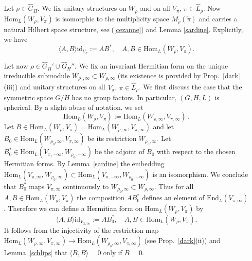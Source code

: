 \documentclass[10]{amsart}
\theoremstyle{remark}
\theoremstyle{definition}
\numberwithin{equation}{section}
\newcommand{\End}{\text{End}}
\newcommand{\Hom}{\mathrm{Hom}}
\newcommand{\id}{\mathrm{id}}
\begin{document}
{Let $\rho\in\widehat G_H$. We fix unitary structures on $W_\rho$ and on all $V_\pi$, $\pi\in\widehat L_\rho$.
Now $\Hom_L(W_{\rho},V_{\pi})$
is isomorphic to the multiplicity space $M_{\tilde\rho}(\tilde\pi)$ and carries a natural Hilbert space structure, see (\ref{cezanne}) and Lemma \ref{sardine}. Explicitly, we have
$$ \langle A, B\rangle \id_{V_\pi}:=AB^*,\quad A,B\in \Hom_L(W_{\rho},V_{\pi}).$$

Let now $\rho\in \widehat G_H'\cup \widehat G_H''$. We fix an invariant Hermitian form on the unique irreducible submodule $W_{\rho_0,\infty}\subset W_{\rho,\infty}$ (its existence is provided by Prop.~\ref{dark}(iii)) and unitary structures on all 
$V_\pi$, $\pi\in\widehat L_\rho$. We first discuss the case that the symmetric space $G/H$ has no group factors. In particular, $(G,H,L)$ is spherical. By a slight abuse
of notation, we set 
$$ \Hom_L(W_\rho, V_\pi):=\Hom_L(W_{\rho,\infty}, V_{\pi,\infty})\ .$$
Let $B\in \Hom_L(W_\rho, V_\pi)=\Hom_L(W_{\rho,\infty}, V_{\pi,\infty})$ and let $B_0\in \Hom_L(W_{\rho_0,\infty}, V_{\pi,\infty})$ be its restriction $W_{\rho_0,\infty}$. Let 
$B_0^*\in \Hom_L(V_{\pi,-\infty},W_{\rho_0,-\infty})$ be the adjoint of $B_0$ with respect to the chosen Hermitian forms. 
By Lemma~\ref{sardine} the embedding 
$\Hom_L(V_{\pi,\infty},W_{\rho_0,\infty})\subset\Hom_L(V_{\pi,-\infty},W_{\rho_0,-\infty})$ is an isomorphism. We conclude that $ B_0^*$ maps $V_{\pi,\infty}$ continuously to $W_{\rho_0,\infty}\subset W_{\rho,\infty}$. Thus for all $A,B\in \Hom_L(W_\rho, V_\pi)$ the composition $AB_0^*$ defines an element of $\End_L(V_{\pi,\infty})$. Therefore
we can define a Hermitian form on $\Hom_L(W_\rho, V_\pi)$ by 
$$ \langle A, B\rangle \id_{V_{\pi,\infty}}:=AB_0^*,\quad A,B\in \Hom_L(W_{\rho},V_{\pi}).$$
It follows from the injectivity of the restriction map $\Hom_L(W_{\rho,\infty},V_{\pi,\infty})\rightarrow \Hom_L(W_{\rho_0,\infty},V_{\pi,\infty})$ (see Prop.~\ref{dark}(ii)) and Lemma~\ref{schlips} that  $\langle B, B\rangle=0$ only if $B=0$.

}
\end{document}
